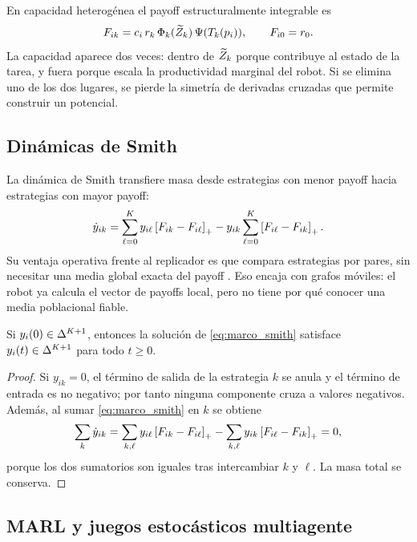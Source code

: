En capacidad heterogénea el payoff estructuralmente integrable es
\begin{equation}
  F_{ik}=c_i\,r_k\,\Phi_k(\widetilde{Z}_k)\,\Psi(T_k(p_i)),
  \qquad F_{i0}=r_0.
  \label{eq:marco_payoff_hetero}
\end{equation}
La capacidad aparece dos veces: dentro de $\widetilde{Z}_k$ porque contribuye al estado de la
tarea, y fuera porque escala la productividad marginal del robot. Si se elimina uno de
los dos lugares, se pierde la simetría de derivadas cruzadas que permite construir un
potencial.

\subsection{Dinámicas de Smith}

La dinámica de Smith transfiere masa desde estrategias con menor payoff hacia
estrategias con mayor payoff:
\begin{equation}
  \dot y_{ik}
  =
  \sum_{\ell=0}^{K} y_{i\ell}\left[F_{ik}-F_{i\ell}\right]_{+}
  -
  y_{ik}\sum_{\ell=0}^{K}\left[F_{i\ell}-F_{ik}\right]_{+}.
  \label{eq:marco_smith}
\end{equation}
Su ventaja operativa frente al replicador es que compara estrategias por pares, sin
necesitar una media global exacta del payoff \citep{sandholm2010population,
quijano2017population}. Eso encaja con grafos móviles: el robot ya calcula el vector de
payoffs local, pero no tiene por qué conocer una media poblacional fiable.

\begin{lema}
Si $y_i(0)\in\Delta^{K+1}$, entonces la solución de
\eqref{eq:marco_smith} satisface $y_i(t)\in\Delta^{K+1}$ para todo $t\ge0$.
\end{lema}

\begin{proof}
Si $y_{ik}=0$, el término de salida de la estrategia $k$ se anula y el término de
entrada es no negativo; por tanto ninguna componente cruza a valores negativos. Además,
al sumar \eqref{eq:marco_smith} en $k$ se obtiene
\[
  \sum_k\dot y_{ik}
  =
  \sum_{k,\ell}y_{i\ell}\left[F_{ik}-F_{i\ell}\right]_{+}
  -
  \sum_{k,\ell}y_{ik}\left[F_{i\ell}-F_{ik}\right]_{+}=0,
\]
porque los dos sumatorios son iguales tras intercambiar $k$ y $\ell$. La masa total se
conserva.
\end{proof}

\subsection{MARL y juegos estocásticos multiagente}
\label{subsec:marl}


